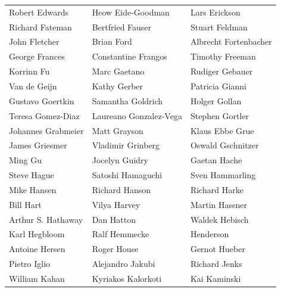 \begin{tabular}{lll}
Robert Edwards         & Heow Eide-Goodman      & Lars Erickson\\
Richard Fateman        & Bertfried Fauser       & Stuart Feldman\\
John Fletcher          & Brian Ford             & Albrecht Fortenbacher\\
George Frances         & Constantine Frangos    & Timothy Freeman\\
Korrinn Fu             & Marc Gaetano           & Rudiger Gebauer\\
Van de Geijn           & Kathy Gerber           & Patricia Gianni\\
Gustavo Goertkin       & Samantha Goldrich      & Holger Gollan\\
Teresa Gomez-Diaz      & Laureano Gonzalez-Vega & Stephen Gortler\\
Johannes Grabmeier     & Matt Grayson           & Klaus Ebbe Grue\\
James Griesmer         & Vladimir Grinberg      & Oswald Gschnitzer\\
Ming Gu                & Jocelyn Guidry         & Gaetan Hache\\
Steve Hague            & Satoshi Hamaguchi      & Sven Hammarling\\
Mike Hansen            & Richard Hanson         & Richard Harke\\
Bill Hart              & Vilya Harvey           & Martin Hassner\\
Arthur S. Hathaway     & Dan Hatton             & Waldek Hebisch\\
Karl Hegbloom          & Ralf Hemmecke          & Henderson\\
Antoine Hersen         & Roger House            & Gernot Hueber\\
Pietro Iglio           & Alejandro Jakubi       & Richard Jenks\\
William Kahan          & Kyriakos Kalorkoti     & Kai Kaminski\\
\end{tabular}
\vfill
\newpage
